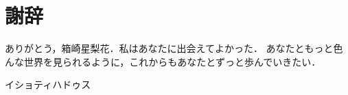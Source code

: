 \section*{謝辞}
ありがとう，箱崎星梨花．私はあなたに出会えてよかった．
あなたともっと色んな世界を見られるように，これからもあなたとずっと歩んでいきたい．


\begin{flushright}
    \hspace{0pt}\par
    \thedate\par
    イショティハドゥス
\end{flushright}
